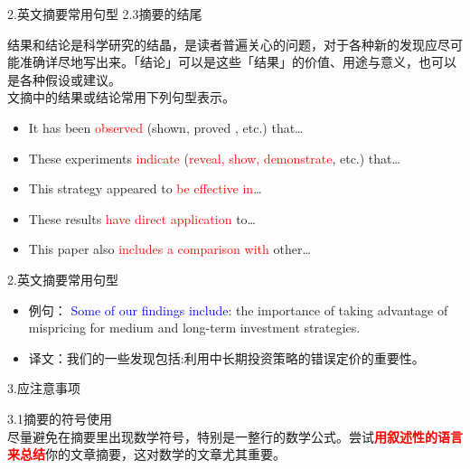 \documentclass[13pt]{ctexbeamer}
\newcommand{\red}[1]{\textcolor{red}{#1}}
\newcommand{\blue}[1]{\textcolor{blue}{#1}}
\begin{document}
\begin{frame}{2.英文摘要常用句型}
    2.3摘要的结尾\\
    \renewcommand{\baselinestretch}{1.3}

    结果和结论是科学研究的结晶，是读者普遍关心的问题，对于各种新的发现应尽可能准确详尽地写出来。「结论」可以是这些「结果」的价值、用途与意义，也可以是各种假设或建议。\\文摘中的结果或结论常用下列句型表示。

    \begin{itemize}
        \item
        It has been \red{observed} (shown, proved , etc.) that…
        \item
        These experiments \red{indicate} (\red{reveal, show, demonstrate}, etc.) that…
        \item
        This strategy appeared to \red{be effective in}…
        \item
        These results \red{have direct application} to…
        \item
        This paper also \red{includes a comparison with} other…

    \end{itemize}

    \vspace{15pt}

\end{frame}
\begin{frame}{2.英文摘要常用句型}

    \renewcommand{\baselinestretch}{1.3}


    \begin{itemize}
        \item
        例句：	\blue{Some of our findings include}: the importance of taking advantage of mispricing for medium and long-term investment strategies.
        \item
        译文：我们的一些发现包括:利用中长期投资策略的错误定价的重要性。

    \end{itemize}

    \vspace{15pt}

\end{frame}
\begin{frame}{3.应注意事项}

    3.1摘要的符号使用\\
    \renewcommand{\baselinestretch}{1.3}
    尽量避免在摘要里出现数学符号，特别是一整行的数学公式。尝试\red{\textbf{用叙述性的语言来总结}}你的文章摘要，这对数学的文章尤其重要。\vspace{0.6em}



    \vspace{15pt}

\end{frame}
\end{document}
